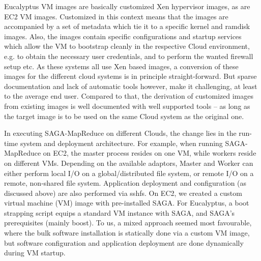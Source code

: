 \documentclass[conference,final]{IEEEtran}
\newcommand{\sagamapreduce }{SAGA-MapReduce }
\begin{document}
Eucalyptus VM images are basically customized Xen hypervisor images,
as are EC2 VM images.  Customized in this context means that the
images are accompanied by a set of metadata which tie it to a specific
kernel and ramdisk images.  Also, the images contain specific
configurations and startup services which allow the VM to bootstrap
cleanly in the respective Cloud environment, e.g. to obtain the
necessary user credentials, and to perform the wanted firewall setup
etc.  As these systems all use Xen based images, a conversion of these
images for the different cloud systems is in principle
straight-forward.  But sparse documentation and lack of automatic
tools however, make it challenging, at least to the average end
user. Compared to that, the derivation of customized images from
existing images is well documented with well supported tools -- as
long as the target image is to be used on the same Cloud system as the
original one.

In executing \sagamapreduce on different Clouds, the change lies in
the run-time system and deployment architecture. For example, when
running \sagamapreduce on EC2, the master process resides on one VM,
while workers reside on different VMs.  Depending on the available
adaptors, Master and Worker can either perform local I/O on a
global/distributed file system, or remote I/O on a remote, non-shared
file system.  %
Application deployment and configuration (as discussed above) are also
performed via sshfs.  On EC2, we created a custom virtual machine
(VM) image with pre-installed SAGA.  For Eucalyptus, a boot strapping
script equips a standard VM instance with SAGA, and SAGA's
prerequisites (mainly boost).  To us, a mixed approach seemed most
favourable, where the bulk software installation is statically done
via a custom VM image, but software configuration and application
deployment are done dynamically during VM startup.
\end{document}
